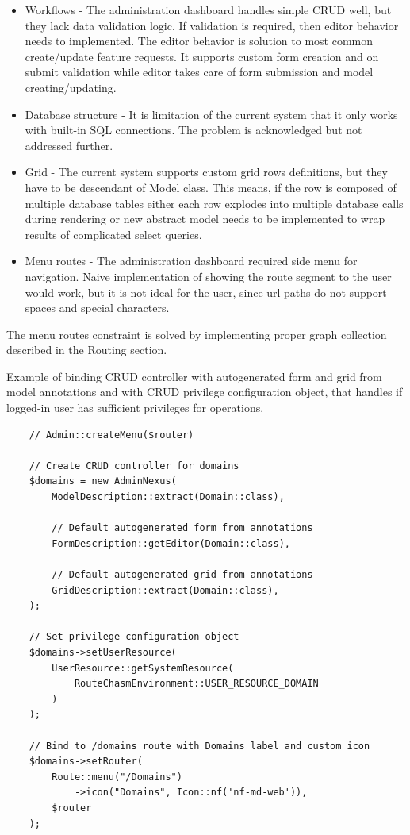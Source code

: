 \begin{itemize}
    \item Workflows - The administration dashboard handles simple CRUD well, but they lack data validation logic.
        If validation is required, then editor behavior needs to implemented.
        The editor behavior is solution to most common create/update feature requests.
        It supports custom form creation and on submit validation while editor takes care of form submission and model creating/updating.
    \item Database structure - It is limitation of the current system that it only works with built-in SQL connections.
        The problem is acknowledged but not addressed further.
    \item Grid - The current system supports custom grid rows definitions, but they have to be descendant of Model class.
        This means, if the row is composed of multiple database tables either each row explodes into multiple database calls
        during rendering or new abstract model needs to be implemented to wrap results of complicated select queries.
    \item Menu routes - The administration dashboard required side menu for navigation.
        Naive implementation of showing the route segment to the user would work, but it is not ideal for the user,
        since url paths do not support spaces and special characters.
\end{itemize}

The menu routes constraint is solved by implementing proper graph collection described in the Routing section.

Example of binding CRUD controller with autogenerated form and grid from model annotations and with CRUD privilege
configuration object, that handles if logged-in user has sufficient privileges for operations.

\begin{verbatim}
    // Admin::createMenu($router)

    // Create CRUD controller for domains
    $domains = new AdminNexus(
        ModelDescription::extract(Domain::class),

        // Default autogenerated form from annotations
        FormDescription::getEditor(Domain::class),

        // Default autogenerated grid from annotations
        GridDescription::extract(Domain::class),
    );

    // Set privilege configuration object
    $domains->setUserResource(
        UserResource::getSystemResource(
            RouteChasmEnvironment::USER_RESOURCE_DOMAIN
        )
    );

    // Bind to /domains route with Domains label and custom icon
    $domains->setRouter(
        Route::menu("/Domains")
            ->icon("Domains", Icon::nf('nf-md-web')),
        $router
    );
\end{verbatim}

